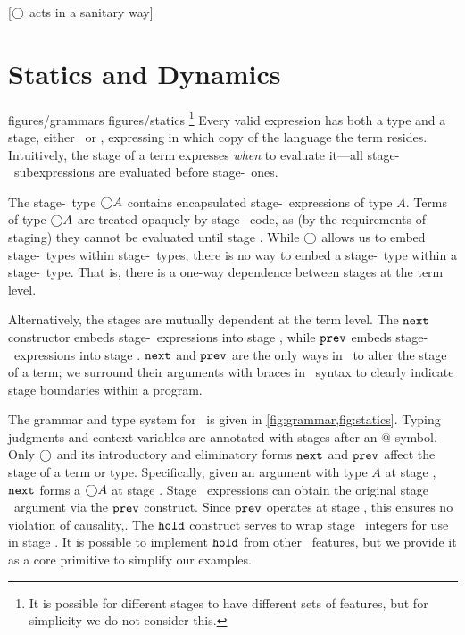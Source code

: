 [$\bigcirc$ acts in a sanitary way]

\section{Statics and Dynamics}
\label{sec:semantics}

 {figures/grammars}
 {figures/statics}
%
\footnote{It is possible for different stages to have different sets of
features, but for simplicity we do not consider this.}
Every valid expression has both a type and a stage, either \bbone~or \bbtwo,
expressing in which copy of the language the term resides. Intuitively, the
stage of a term expresses \emph{when} to evaluate it---all stage-\bbone\
subexpressions are evaluated before stage-\bbtwo\ ones.

The stage-\bbone\ type $\bigcirc A$ contains encapsulated
stage-\bbtwo\ expressions of type $A$. Terms of type $\bigcirc A$ are treated
opaquely by stage-\bbone\ code, as (by the requirements of staging) they cannot be evaluated until stage \bbtwo.
While $\bigcirc$ allows us to embed stage-\bbtwo\ types within stage-\bbone\ types,
there is no way to embed a stage-\bbone\ type within a stage-\bbtwo\ type.
That is, there is a one-way dependence between stages at the term level.

Alternatively, the stages are mutually dependent at the term level.
The ${\tt next}$ constructor embeds stage-\bbtwo\ expressions into stage \bbone,
while ${\tt prev}$ embeds stage-\bbone\ expressions into stage \bbtwo.  ${\tt next}$ and ${\tt prev}$ are the
only ways in \lang\ to alter the stage of a term; we surround their arguments
with braces in \lang\ syntax to clearly indicate stage boundaries within a
program.

The grammar and type system for \lang\ is given in \ref{fig:grammar,fig:statics}. 
Typing judgments and context variables are annotated with stages after an $@$ symbol.
Only $\bigcirc$ and its introductory and eliminatory forms ${\tt next}$ and ${\tt prev}$ affect the stage
of a term or type.
Specifically, given an argument with type $A$ at stage \bbtwo, ${\tt next}$ forms a $\bigcirc A$ at stage \bbone.  
Stage \bbtwo\ expressions can obtain the original stage \bbtwo\ argument via the ${\tt prev}$ construct.  
Since ${\tt prev}$ operates at stage \bbtwo, this ensures no violation of causality,\cite{cave14}.
The ${\tt hold}$ construct serves to wrap stage \bbone\ integers for use in stage \bbtwo.  
It is possible to implement ${\tt hold}$ from other \lang\ features, but
we provide it as a core primitive to simplify our examples. 

